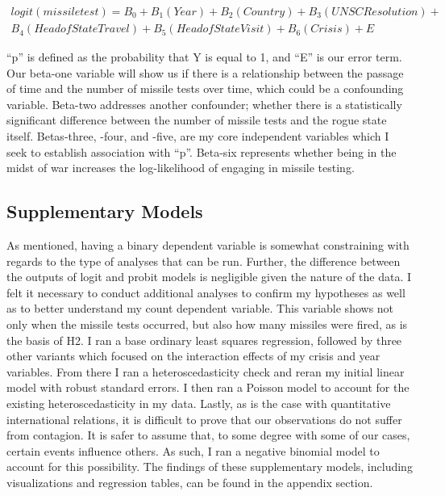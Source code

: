 \documentclass[12pt]{article}
\begin{document}
\begin{equation}
\begin{split}
logit(missile test)= B_0 + B_1(Year) + B_2(Country) + B_3(UNSC Resolution) + \\ 
B_4(Head of State Travel) + B_5(Head of State Visit) + B_6(Crisis) + E
\end{split}
\end{equation}

“p” is defined as the probability that Y is equal to 1, and “\textmd{E}” is our error term. Our beta-one variable will show us if there is a relationship between the passage of time and the number of missile tests over time, which could be a confounding variable. Beta-two addresses another confounder; whether there is a statistically significant difference between the number of missile tests and the rogue state itself. Betas-three, -four, and -five, are my core independent variables which I seek to establish association with “p”. Beta-six represents whether being in the midst of war increases the log-likelihood of engaging in missile testing.

\subsection{Supplementary Models}  
As mentioned, having a binary dependent variable is somewhat constraining with regards to the type of analyses that can be run. Further, the difference between the outputs of logit and probit models is negligible given the nature of the data. I felt it necessary to conduct additional analyses to confirm my hypotheses as well as to better understand my count dependent variable. This variable shows not only when the missile tests occurred, but also how many missiles were fired, as is the basis of H2. I ran a base ordinary least squares regression, followed by three other variants which focused on the interaction effects of my crisis and year variables. From there I ran a heteroscedasticity check and reran my initial linear model with robust standard errors. I then ran a Poisson model to account for the existing heteroscedasticity in my data. Lastly, as is the case with quantitative international relations, it is difficult to prove that our observations do not suffer from contagion. It is safer to assume that, to some degree with some of our cases, certain events influence others. As such, I ran a negative binomial model to account for this possibility. The findings of these supplementary models, including visualizations and regression tables, can be found in the appendix section.  
\end{document}
